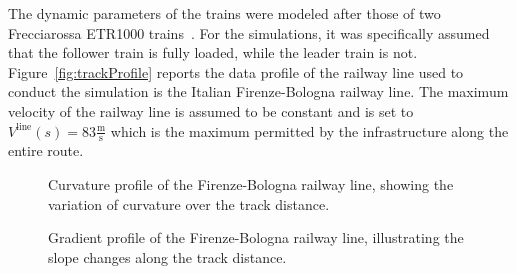 \documentclass[letterpaper, 10 pt, conference]{ieeeconf}
\theoremstyle{definition}
\theoremstyle{nopoint}
\newcommand{\tildeAdd}{~}
\begin{document}
  The dynamic parameters of the trains were modeled after those of two Frecciarossa ETR1000 trains\tildeAdd\cite{frecciarossa}. For the simulations, it was specifically assumed that the follower train is fully loaded, while the leader train is not. Figure\tildeAdd\ref{fig:trackProfile} reports the data profile of the railway line used to conduct the simulation is the Italian Firenze-Bologna railway line. The maximum velocity of the railway line is assumed to be constant and is set to $V^{\mathrm{line}}(s) = 83\unit{\frac{\unit{\meter}}{\unit{\second}}}$ which is the maximum permitted by the infrastructure along the entire route.
  
  	\begin{figure}[ht]
  			\caption{Curvature profile of the Firenze-Bologna railway line, showing the variation of curvature over the track distance.}
  			 \label{fig:trackcurvature}	
  		\end{figure}
  		
  		  	\begin{figure}[ht]
  			\caption{Gradient profile of the Firenze-Bologna railway line, illustrating the slope changes along the track distance.}
  			\label{fig:trackgrad}	
  		\end{figure}
  		
\end{document}
